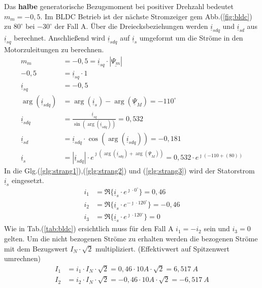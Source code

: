\begin{solution}
\begin{compactenum}
\item Das \textbf{halbe} generatorische Bezugsmoment bei positiver Drehzahl bedeutet $m_m = -0,5$. Im BLDC Betrieb ist der nächste Stromzeiger gem Abb.(\ref{fig:bldc}) zu $80^\circ$ bei $-30^\circ$ der Fall A. Über die Dreiecksbeziehungen werden $\underline{i}_{sdq}$ und $\underline{i}_{sd}$ aus $\underline{i}_{sq}$ berechnet. Anschließend wird $\underline{i}_{sdq}$ auf $\underline{i}_{s}$ umgeformt um die Ströme in den Motorzuleitungen zu berechnen.
\begin{align}
m_m &= -0,5 = \underline{i}_{sq} \cdot |\underline{\Psi_m}|\\
-0,5 &= \underline{i}_{sq} \cdot 1\\
\underline{i}_{sq} &= -0,5\\
\arg(\underline{i}_{sdq}) &= \arg(\underline{i}_{s}) -\arg(\underline{\Psi}_{M})=-110^\circ\\
\underline{i}_{sdq} &= \frac{\underline{i}_{sq}}{\sin(\arg(\underline{i}_{sdq}))}= 0,532\\
\underline{i}_{sd} &= \underline{i}_{sdq} \cdot \cos(\arg(\underline{i}_{sdq})) = -0,181\\
\underline{i}_{s} &= |\underline{i}_{sdq}| \cdot e^{\jmath (\arg(\underline{i}_{sdq}) + \arg(\underline{\Psi}_{M}))}= 0,532 \cdot e^{\jmath ( -110 + (80))}
\end{align}
In die Glg.(\ref{glg:strang1}),(\ref{glg:strang2}) und (\ref{glg:strang3}) wird der Statorstrom $\underline{i}_s$ eingesetzt.
\begin{align}
i_1 & = \Re \{ \underline{i}_s \cdot e^{\jmath \cdot 0 ^\circ} \} = 0,46\\
i_2 & = \Re \{ \underline{i}_s \cdot e^{-\jmath \cdot 120 ^\circ} \} = -0,46 \\
i_3 & = \Re \{ \underline{i}_s \cdot e^{\jmath \cdot 120 ^\circ} \}=  0
\end{align}
Wie in Tab.(\ref{tab:bldc}) ersichtlich muss für den Fall A $i_1= -i_2$ sein und $i_3= 0$ gelten.
Um die nicht bezogenen Ströme zu erhalten werden die bezogenen Ströme mit dem Bezugswert $I_N \cdot \sqrt{2}$ multipliziert. (Effektivwert auf Spitzenwert umrechnen)
\begin{align}
I_1 & = i_1 \cdot I_N \cdot \sqrt{2} = 0,46\cdot 10 A \cdot \sqrt{2} =6,517~A \\
I_2 & = i_2 \cdot I_N \cdot \sqrt{2} = -0,46 \cdot 10 A \cdot \sqrt{2} =-6,517~A \\

\end{align}
\end{compactenum}
\end{solution}
